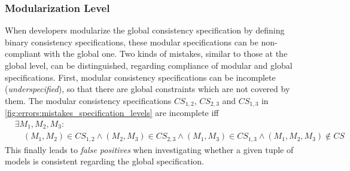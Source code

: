 \subsubsection{Modularization Level}
When developers modularize the global consistency specification by defining binary consistency specifications, these modular specifications can be non-compliant with the global one. 
Two kinds of mistakes, similar to those at the global level, can be distinguished, regarding compliance of modular and global specifications. %
First, modular consistency specifications can be incomplete (\emph{underspecified}), so that there are global constraints which are not covered by them. 
The modular consistency specifications $\mathit{CS}_{1,2}$, $\mathit{CS}_{2,3}$ and $\mathit{CS}_{1,3}$ in \autoref{fig:errors:mistakes_specification_levels} are incomplete iff
\begin{align*}
    & \exists M_1, M_2, M_3 : \\
    & \hspace{1em} (M_1, M_2) \in \mathit{CS}_{1,2} \land (M_2, M_3) \in \mathit{CS}_{2,3} \land (M_1, M_3) \in \mathit{CS}_{1,3} \land (M_1, M_2, M_3) \not\in \mathit{CS}
\end{align*}
This finally leads to \emph{false positives} when investigating whether a given tuple of models is consistent regarding the global specification. %
